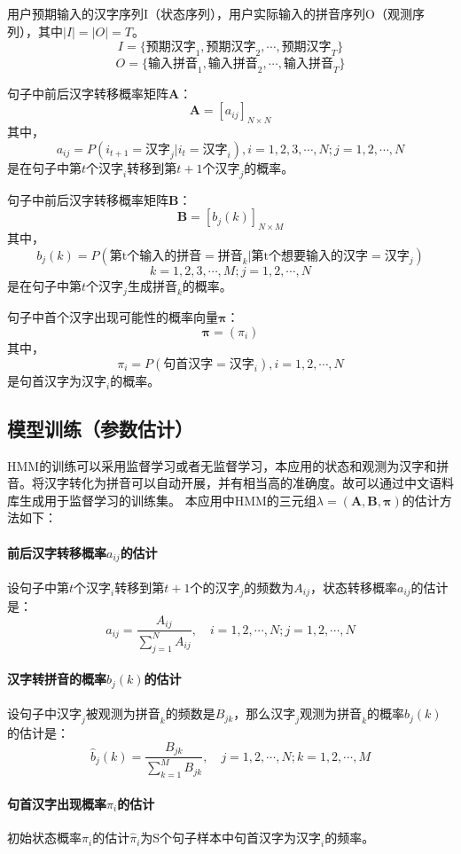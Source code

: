 \documentclass[12pt,a4paper]{ctexart}
\begin{document}
用户预期输入的汉字序列I（状态序列），用户实际输入的拼音序列O（观测序列），其中$ |I|=|O|=T $。
\[ I=\{ \mbox{预期汉字}_1,\mbox{预期汉字}_2,\cdots,\mbox{预期汉字}_T \}	\]
\[O=\{ \mbox{输入拼音}_1,\mbox{输入拼音}_2,\cdots,\mbox{输入拼音}_T \}  \]

句子中前后汉字转移概率矩阵$\bm{A}$：
\[ \bm{A}=[a_{ij}]_{N\times N} \]
其中，
\[ a_{ij}=P(i_{t+1}=\mbox{汉字}_j|i_t=\mbox{汉字}_i),  i=1,2,3,\cdots,N; j=1,2,\cdots,N\]
是在句子中第$ t $个$ \mbox{汉字}_i $转移到第$ t+1 $个$ \mbox{汉字}_j $的概率。

句子中前后汉字转移概率矩阵$\bm{B}$：
\[ \bm{B}=[b_j(k)]_{N\times M} \]
其中，
\[ b_j(k)=P(\mbox{第t个输入的拼音}=\mbox{拼音}_k|\mbox{第t个想要输入的汉字}=\mbox{汉字}_j) \]
\[ k=1,2,3,\cdots,M; j=1,2,\cdots,N\]
是在句子中第$ t $个$ \mbox{汉字}_j $生成$ \mbox{拼音}_k $的概率。

句子中首个汉字出现可能性的概率向量$\bm{\pi}$：
\[ \bm{\pi}=(\pi_i) \]
其中，
\[ \pi_i=P(\mbox{句首汉字}=\mbox{汉字}_i), i=1,2,\cdots,N \]
是句首汉字为$\mbox{汉字}_i$的概率。
\subsection{模型训练（参数估计）}
HMM的训练可以采用监督学习或者无监督学习\cite{李航统计学习}，本应用的状态和观测为汉字和拼音。将汉字转化为拼音可以自动开展\cite{python-pinyin}，并有相当高的准确度\cite{accuracy-of-auto-pinyin}。故可以通过中文语料库生成用于监督学习的训练集。
本应用中HMM的三元组$ \lambda=(\bm{A},\bm{B},\bm{\pi}) $的估计方法如下：
\paragraph{前后汉字转移概率$a_{ij}$的估计}
设句子中第$ t $个$\mbox{汉字}_i$转移到第$ t+1 $个的$\mbox{汉字}_j$的频数为$A_{ij}$，状态转移概率$a_{ij}$的估计是：
\[ \hat{a}_{i j}=\frac{A_{ij}}{\sum_{j=1}^{N} A_{i j}}, \quad i=1,2, \cdots, N ; j=1,2, \cdots, N \]
\paragraph{汉字转拼音的概率$b_j(k)$的估计}
设句子中$\mbox{汉字}_j$被观测为$\mbox{拼音}_k$的频数是$B_{j k}$，那么$\mbox{汉字}_j$观测为$\mbox{拼音}_k$的概率$b_{j}(k)$的估计是：
\[ \hat{b}_{j}(k)=\frac{B_{j k}}{\sum_{k=1}^{M} B_{j k}}, \quad j=1,2, \cdots, N ; k=1,2, \cdots, M \]
\paragraph{句首汉字出现概率$\pi_i$的估计}
初始状态概率$\pi_i$的估计$\hat{\pi}_i$为S个句子样本中句首汉字为$\mbox{汉字}_i$的频率。
\end{document}
